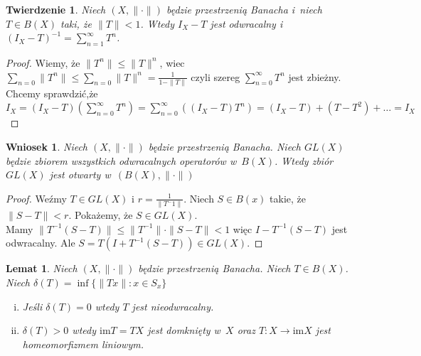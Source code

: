 \documentclass[11pt]{mwrep}
\renewcommand{\[}{\begin{equation}}
\renewcommand{\]}{\end{equation}}
\newcommand{\norm}{\|\cdot\|}
\newcommand{\im}{\mathrm{im}}
\newtheorem{twr}[subsection]{Twierdzenie}%
\newtheorem{lem}[subsection]{Lemat}
\newtheorem{wn}[subsection]{Wniosek}
\newcounter{numer}
\begin{document}
\begin{twr}
	Niech $(X,\norm)$ będzie przestrzenią Banacha i~niech $T\in B(X)$ taki, że $\|T\| <1$. Wtedy $I_X - T$ jest odwracalny i~
	$\left( I_X - T  \right)^{-1} = \sum_{n=1}^\infty T^n$.
\end{twr}
\begin{proof}
	Wiemy, że $\|T^n\|\le \|T\|^n$, wiec $\sum_{n=0}\|T^n\| \le \sum_{n=0} \|T\|^n = \frac{1}{1-\|T\|}$ czyli
	szereg $\sum_{n=0}^\infty T^n$ jest zbieżny. 
	Chcemy sprawdzić,że $I_X=(I_X -T)  \left( \sum_{n=0}^\infty T^n \right)= \sum_{n=0}^\infty \left( (I_X-T) T^n \right)=
	(I_X-T)+(T-T^2)+\ldots=I_X$
\end{proof}
\begin{wn}
	Niech $(X,\norm)$ będzie przestrzenią Banacha. Niech $GL(X)$ będzie zbiorem wszystkich odwracalnych operatorów w~$B(X)$.
	Wtedy zbiór $GL(X)$ jest otwarty w~$(B(X),\norm)$ 
\end{wn}
\begin{proof}
	Weźmy $T\in GL(X)$ i $r= \frac{1}{\|T^-1\|}$. Niech $S\in B(x)$ takie, że$\|S-T\|<r$.
	Pokażemy, że $S \in GL(X)$. \\
	Mamy $\|T^{-1}(S-T)\| \le \|T^{-1}\|\cdot\|S - T\| <1$ więc $I-T^{-1}(S - T)$ jest odwracalny.
	Ale $S= T(I+T^{-1}(S - T ))\in GL(X)$. 
\end{proof}
\begin{lem}
	Niech $(X,\norm)$ będzie przestrzenią Banacha. Niech $T \in B(X)$.
	Niech $\delta(T) = \inf\{ \|Tx\|: x \in S_x\}$ 
	\begin{enumerate}[(i)]
		\item Jeśli $\delta(T) = 0$ wtedy $T$ jest nieodwracalny.
		\item $\delta(T) >0$ wtedy $\im T =TX$ jest domknięty w~$X$ oraz $T\colon X \to \im X$ jest homeomorfizmem liniowym.
	\end{enumerate}
\end{lem}
\end{document}
